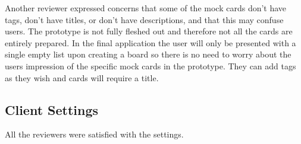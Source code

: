     Another reviewer expressed concerns that some of the mock cards don't have tags, don't have titles, or don't have descriptions, and that this may confuse users. The prototype is not fully fleshed out and therefore not all the cards are entirely prepared. In the final application the user will only be presented with a single empty list upon creating a board so there is no need to worry about the users impression of the specific mock cards in the prototype. They can add tags as they wish and cards will require a title.

\subsection{Client Settings}

    All the reviewers were satisfied with the settings.
    

